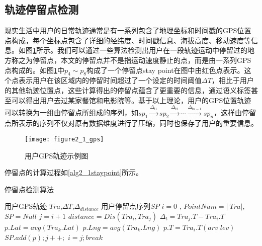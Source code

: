\subsection{轨迹停留点检测}
现实生活中用户的日常轨迹通常是有一系列包含了地理坐标和时间戳的GPS位置点构成，每个坐标点包含了详细的经纬度、时间戳信息、海拔高度、移动速度等信息。如图\ref{fig:2_1}所示。我们可以通过一些算法检测出用户在一段轨迹运动中停留过的地方称之为停留点，本文的停留点并不是指运动速度静止的点，而是由一系列GPS点构成的。如图\ref{fig:2_1}中$p_{4} \sim p_{8}$构成了一个停留点stay point在图中由红色点表示。这个点表示用户在该区域内的停留时间超过了一个设定的时间阈值$\Delta T$，相比于用户的其他轨迹位置点，这些计算得出的停留点蕴含了更重要的信息，通过语义标签甚至可以得出用户去过某家餐馆和电影院等。基于以上理论，用户的GPS位置轨迹可以转换为一组由停留点所组成的序列，如$sp_{1}\overset{\Delta_{t1}}{\rightarrow} sp_{2}\overset{\Delta_{t2}}{\rightarrow}\cdots \overset{\Delta_{tn-1}}{\rightarrow}sp_{n}$，这样由停留点所表示的序列不仅对原有数据维度进行了压缩，同时也保存了用户的重要信息。
\begin{figure}[H]
\centering
\texttt{[image: figure2\_1\_gps]}
\caption{用户GPS轨迹示例图}
\label{fig:2_1}
\end{figure}
\par 停留点的计算过程如\ref{alg2_1staypoint}所示。
\begin{algorithm}[htb]
\caption{停留点检测算法}
\label{alg2_1staypoint}
\begin{algorithmic}[1] %
				\REQUIRE 用户GPS轨迹 $Tra$,$\Delta T$,$\Delta_{distance}$
				\ENSURE 用户停留点序列$SP$
				\STATE $i = 0$ , $PointNum= \left| \ Tra \right|$,$SP = Null$
				\STATE $j = i+1$
				\STATE $distance=Dis(Tra_{i},Tra_{j})$
				\STATE $\Delta_{t}=Tra_{j}.T-Tra_{i}.T$
				\STATE $p.Lat = avg(Tra_{k}.Lat)  $
				\STATE $p.Lng = avg(Tra_{k}.Lng)$
				\STATE $p.T = Tra_{i}.T(arv|lev)$%
				\STATE $SP .add(p) ;j++; $
				\ENDIF				
				\ENDIF				
				\ENDWHILE
				\STATE $i=j ; break$
				\ENDWHILE
				\STATE {}
\end{algorithmic}
\end{algorithm}
